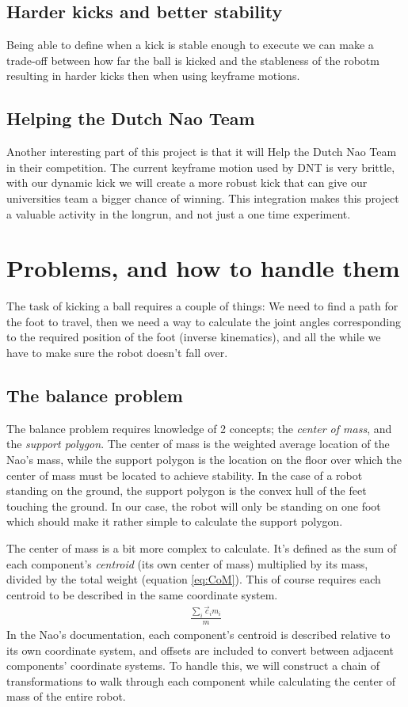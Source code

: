 \documentclass[a4paper]{article}
\begin{document}
\subsection{Harder kicks and better stability}
Being able to define when a kick is stable enough to execute we can make a
trade-off between how far the ball is kicked and the stableness of the
robotm resulting in harder kicks then when using keyframe motions.

\subsection{Helping the Dutch Nao Team}
Another interesting part of this project
is that it will Help the Dutch Nao Team in their competition. The
current keyframe motion used by DNT is very brittle, with our dynamic kick we will create a
more robust kick that can give our universities team a bigger chance of winning. 
This integration makes this project a valuable activity in the longrun, and not
just a one time experiment.

\section{Problems, and how to handle them}
The task of kicking a ball requires a couple of things: We need to find a path
for the foot to travel, then we need a way to calculate the joint angles
corresponding to the required position of the foot (inverse kinematics), and all
the while we have to make sure the robot doesn’t fall over.

\subsection{The balance problem}
The balance problem requires knowledge of 2 concepts; the \emph{center of mass},
and the \emph{support polygon}. The center of mass is the weighted average
location of the Nao’s mass, while the support polygon is the location on the
floor over which the center of mass must be located to achieve stability. In the
case of a robot standing on the ground, the support polygon is the convex hull
of the feet touching the ground. In our case, the robot will only be standing on
one foot which should make it rather simple to calculate the support polygon. 

The center of mass is a bit more complex to calculate. It’s defined as the sum
of each component’s \emph{centroid} (its own center of mass) multiplied by its
mass, divided by the total weight (equation \ref{eq:CoM}). This of course
requires each centroid to be described in the same coordinate system.
\begin{align}
  \frac{\sum_i \vec{c}_i m_i} {m}        \label{eq:CoM}
\end{align}
In the Nao’s documentation, each component’s centroid is described relative to
its own coordinate system, and offsets are included to convert between adjacent
components’ coordinate systems. To handle this, we will construct a chain of
transformations to walk through each component while calculating the center of
mass of the entire robot.
\end{document}
